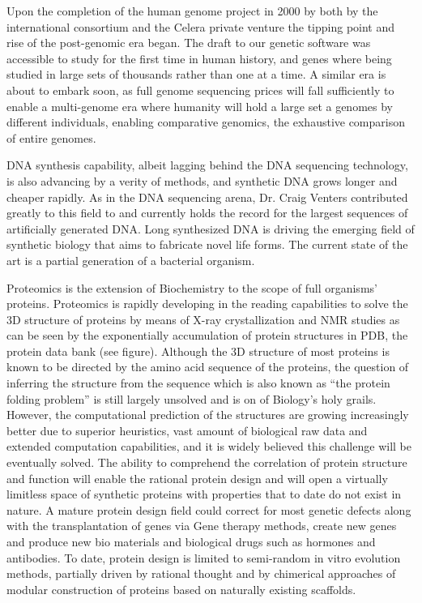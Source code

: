 \documentclass[letter,11pt]{article}
\begin{document}
Upon the completion of the human genome project in 2000 by both by the
international consortium and the Celera private venture the tipping point and
rise of the post-genomic era began. The draft to our genetic software was
accessible to study for the first time in human history, and genes where being
studied in large sets of thousands rather than one at a time.  A similar era is
about to embark soon, as full genome sequencing prices will fall sufficiently
to enable a multi-genome era where humanity will hold a large set a genomes by
different individuals, enabling comparative genomics, the exhaustive comparison
of entire genomes.
 
DNA synthesis capability, albeit lagging behind the DNA sequencing technology,
is also advancing by a verity of methods, and synthetic DNA grows longer and
cheaper rapidly. As in the DNA sequencing arena, Dr. Craig Venters contributed
greatly to this field to and currently holds the record for the largest
sequences of artificially generated DNA.  Long synthesized DNA is driving the
emerging field of synthetic biology that aims to fabricate novel life forms.
The current state of the art is a partial generation of a bacterial organism.
 
Proteomics is the extension of Biochemistry to the scope of full organisms'
proteins.  Proteomics is rapidly developing in the reading capabilities to
solve the 3D structure of proteins by means of X-ray crystallization and NMR
studies as can be seen by the exponentially accumulation of protein structures
in PDB, the protein data bank (see figure). Although the 3D structure of most
proteins is known to be directed by the amino acid sequence of the proteins,
the question of inferring the structure from the sequence which is also known
as ``the protein folding problem'' is still largely unsolved and is on of
Biology's holy grails. However, the computational prediction of the structures
are growing increasingly better due to superior heuristics, vast amount of
biological raw data and extended computation capabilities, and it is widely
believed this challenge will be eventually solved. The ability to comprehend
the correlation of protein structure and function will enable the rational
protein design and will open a virtually limitless space of synthetic proteins
with properties that to date do not exist in nature. A mature protein design
field could correct for most genetic defects along with the transplantation of
genes via Gene therapy methods, create new genes and produce new bio materials
and biological drugs such as hormones and antibodies. To date, protein design
is limited to semi-random in vitro evolution methods, partially driven by
rational thought and by chimerical approaches of modular construction of
proteins based on naturally existing scaffolds.
 
\end{document}
